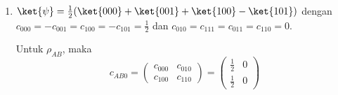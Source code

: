 \begin{enumerate}
	sehingga $\det c_{1BC} = 0$
	
	\begin{equation}
		c_{1BC}^0=
		\begin{pmatrix}
			c_{000} & c_{001} \\
			c_{110} & c_{111}
		\end{pmatrix}=
		\begin{pmatrix}
			\frac{1}{2} & 0 \\
			0 & -\frac{1}{2}
		\end{pmatrix}
	\end{equation}
	
	sehingga $\det c_{1BC}^0 = -\frac{1}{4}$
	
	\begin{equation}
		c_{0BC}^1=
		\begin{pmatrix}
			c_{100} & c_{101} \\
			c_{010} & c_{011}
		\end{pmatrix}=
		\begin{pmatrix}
			0 & \frac{1}{2} \\
			-\frac{1}{2} & 0
		\end{pmatrix}
	\end{equation}
	
	sehingga $\det c_{0BC}^1 = \frac{1}{4}$.
	
	Maka
	\begin{equation}
		\begin{aligned}
			\mathrm{Tr}\,\rho_{BC}\tilde{\rho}_{BC}
			&=4|\det c_{0BC}|^2+4|\det c_{1BC}|^2+2(\det c_{1BC}^0+ \det c_{0BC}^1)(\det c^{*0}_{1BC} + \det c^{*1}_{0BC})\\
			&=4(0)+4(0)+2(-\frac{1}{4}+\frac{1}{4})(-\frac{1}{4}+\frac{1}{4})\\
			&=0
		\end{aligned}
	\end{equation}
	
	\item { $\ket{\psi}=\frac{1}{2}(\ket{000}+\ket{001}+\ket{100}-\ket{101})$}
	dengan $c_{000}=-c_{001}=c_{100}=-c_{101}=\frac{1}{2}$ dan $c_{010}=c_{111}=c_{011}=c_{110}=0$.
	
	Untuk $\rho_{AB}$, maka
	\begin{equation}
		c_{AB0}=
		\begin{pmatrix}
			c_{000} & c_{010} \\
			c_{100} & c_{110}
		\end{pmatrix}=
		\begin{pmatrix}
			\frac{1}{2} & 0 \\
			\frac{1}{2} & 0
		\end{pmatrix}
	\end{equation}
	

\end{enumerate}
